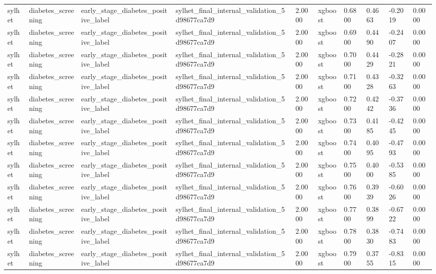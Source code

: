 \begin{tabular}{llllllllll}
sylhet & diabetes\_screening & early\_stage\_diabetes\_positive\_label & sylhet\_final\_internal\_validation\_5d98677ca7d9 & 2.0000 & xgboost & 0.6800 & 0.4663 & -0.2019 & 0.0000 \\
sylhet & diabetes\_screening & early\_stage\_diabetes\_positive\_label & sylhet\_final\_internal\_validation\_5d98677ca7d9 & 2.0000 & xgboost & 0.6900 & 0.4490 & -0.2407 & 0.0000 \\
sylhet & diabetes\_screening & early\_stage\_diabetes\_positive\_label & sylhet\_final\_internal\_validation\_5d98677ca7d9 & 2.0000 & xgboost & 0.7000 & 0.4429 & -0.2821 & 0.0000 \\
sylhet & diabetes\_screening & early\_stage\_diabetes\_positive\_label & sylhet\_final\_internal\_validation\_5d98677ca7d9 & 2.0000 & xgboost & 0.7100 & 0.4328 & -0.3263 & 0.0000 \\
sylhet & diabetes\_screening & early\_stage\_diabetes\_positive\_label & sylhet\_final\_internal\_validation\_5d98677ca7d9 & 2.0000 & xgboost & 0.7200 & 0.4242 & -0.3736 & 0.0000 \\
sylhet & diabetes\_screening & early\_stage\_diabetes\_positive\_label & sylhet\_final\_internal\_validation\_5d98677ca7d9 & 2.0000 & xgboost & 0.7300 & 0.4185 & -0.4245 & 0.0000 \\
sylhet & diabetes\_screening & early\_stage\_diabetes\_positive\_label & sylhet\_final\_internal\_validation\_5d98677ca7d9 & 2.0000 & xgboost & 0.7400 & 0.4095 & -0.4793 & 0.0000 \\
sylhet & diabetes\_screening & early\_stage\_diabetes\_positive\_label & sylhet\_final\_internal\_validation\_5d98677ca7d9 & 2.0000 & xgboost & 0.7500 & 0.4000 & -0.5385 & 0.0000 \\
sylhet & diabetes\_screening & early\_stage\_diabetes\_positive\_label & sylhet\_final\_internal\_validation\_5d98677ca7d9 & 2.0000 & xgboost & 0.7600 & 0.3939 & -0.6026 & 0.0000 \\
sylhet & diabetes\_screening & early\_stage\_diabetes\_positive\_label & sylhet\_final\_internal\_validation\_5d98677ca7d9 & 2.0000 & xgboost & 0.7700 & 0.3899 & -0.6722 & 0.0000 \\
sylhet & diabetes\_screening & early\_stage\_diabetes\_positive\_label & sylhet\_final\_internal\_validation\_5d98677ca7d9 & 2.0000 & xgboost & 0.7800 & 0.3830 & -0.7483 & 0.0000 \\
sylhet & diabetes\_screening & early\_stage\_diabetes\_positive\_label & sylhet\_final\_internal\_validation\_5d98677ca7d9 & 2.0000 & xgboost & 0.7900 & 0.3755 & -0.8315 & 0.0000 \\

\end{tabular}
